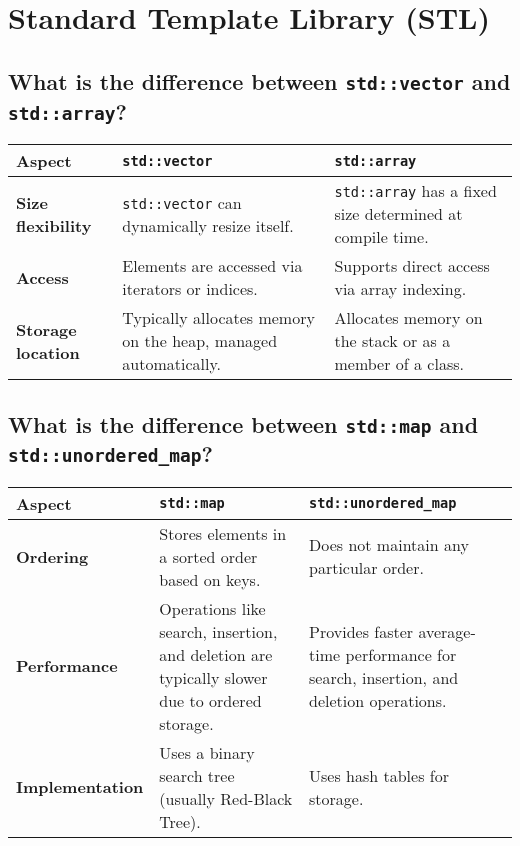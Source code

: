 \section{Standard Template Library (STL)}

\subsection{What is the difference between \texttt{std::vector} and \texttt{std::array}?}
\begin{tabularx}{\textwidth}{|p{3.5cm}|X|X|}
    \hline \rowcolor{tableheader}
    \textbf{Aspect}                  & \textbf{\texttt{std::vector}}                                  & \textbf{\texttt{std::array}} \\
    \hline \textbf{Size flexibility} & \texttt{std::vector} can dynamically resize itself.            & \texttt{std::array} has a fixed size determined at compile time. \\
    \hline \textbf{Access}           & Elements are accessed via iterators or indices.                & Supports direct access via array indexing. \\
    \hline \textbf{Storage location} & Typically allocates memory on the heap, managed automatically. & Allocates memory on the stack or as a member of a class. \\
    \hline
\end{tabularx}

\subsection{What is the difference between \texttt{std::map} and \texttt{std::unordered\_map}?}
\begin{tabularx}{\textwidth}{|p{3.5cm}|X|X|}
    \hline \rowcolor{tableheader}
    \textbf{Aspect}                & \textbf{\texttt{std::map}}                          & \textbf{\texttt{std::unordered\_map}} \\
    \hline \textbf{Ordering}       & Stores elements in a sorted order based on keys.    & Does not maintain any particular order. \\
    \hline \textbf{Performance}    & Operations like search, insertion, and deletion are typically slower due to ordered storage. & Provides faster average-time performance for search, insertion, and deletion operations. \\
    \hline \textbf{Implementation} & Uses a binary search tree (usually Red-Black Tree). & Uses hash tables for storage. \\
    \hline
\end{tabularx}


